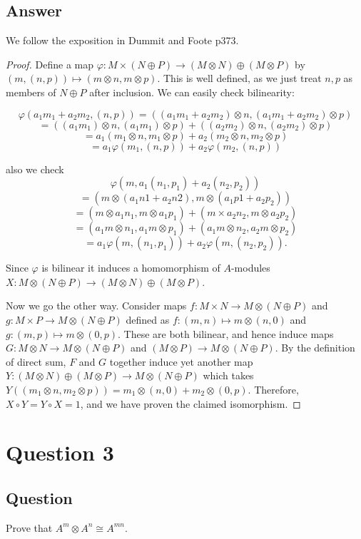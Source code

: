 \documentclass[11pt]{article}
\begin{document}
\subsection{Answer}
We follow the exposition in Dummit and Foote p373.
\begin{proof}

Define a map $\varphi: M \times ( N \oplus P) \to ( M \otimes N) \oplus(M \otimes P)$ by $(m,(n,p)) \mapsto (m \otimes n, m \otimes p)$. This is well defined, as we just treat $n,p$ as members of $N \oplus P$ after inclusion. We can easily check bilinearity:

\[ \varphi (a_1 m_1 + a_2 m_2 , (n, p)) = ((a_1 m_1 + a_2 m_2 )  \otimes  n, (a_1 m_1 + a_2 m_2 )  \otimes  p)\]
\[  = ((a_1 m_1 )  \otimes  n, (a_1 m_1 )  \otimes  p) + ((a_2 m_2 )  \otimes  n, (a_2 m_2 )  \otimes  p) \]
\[= a_1 (m_1  \otimes  n, m_1  \otimes  p) + a_2 (m_2  \otimes  n, m_2  \otimes  p)\]
\[  = a_1  \varphi (m_1 , (n, p)) + a_2  \varphi (m_2 , (n, p))\]

 also we check
 \[  \varphi (m, a_1 (n_1 , p_1 ) +a_2 (n_2 , p_2 )) \]\[= (m 
 \otimes (a_1 n1 +a_2 n2 ), m \otimes (a_1 p1 +a_2 p_2 ))\]
 \[ = (m \otimes a_1 n_1 , m \otimes  
a_1 p_1 ) + (m \times a_2 n_2 , m  \otimes  a_2 p_2 )\]
\[ = (a_1 m  \otimes  n_1 , a_1 m  \otimes  p_1 ) + (a_1 m  \otimes  n_2 , a_2 m  \otimes  p_2 ) \]
\[= a_1  \varphi (m, (n_1 , p_1 )) + a_2  \varphi (m, (n_2 , p_2 )).\]

Since $\varphi $ is bilinear it induces a homomorphism of $A$-modules $X: M \otimes (N \oplus P) \to ( M \otimes N) \oplus (M \otimes P)$.

Now we go the other way. Consider maps $f: M \times N \to M \otimes (N \oplus P)$ and $g: M \times P \to M \otimes (N \oplus P)$ defined as $f: (m,n ) \mapsto m \otimes (n,0)$ and $g: (m,p) \mapsto m \otimes (0,p)$. These are both bilinear, and hence induce maps $G: M \otimes N \to M \otimes (N \oplus P)$ and $( M \otimes P) \to M \otimes (N \oplus P)$. By the definition of direct sum,  $F$ and $G$ together induce yet another map $Y: (M \otimes N) \oplus (M \otimes P) \to M \otimes (N \oplus P) $ which takes $Y((m_1 \otimes n, m_2 \otimes p)) = m_1 \otimes (n,0)+ m_2 \otimes (0,p)$. Therefore, $X \circ Y = Y \circ X=1$, and we have proven the claimed isomorphism.
\end{proof}
\section{Question 3}
\subsection{Question}
Prove that $A^m \otimes A^n \cong A^{mn}$.
\end{document}
